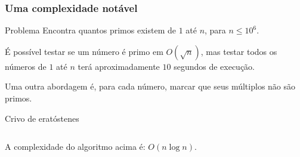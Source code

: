 \begin{frame}[fragile]
    \frametitle{Uma complexidade notável}

    \begin{block}{Problema}
        Encontra quantos primos existem de $1$ até $n$, para $n \leq 10^6$.
    \end{block} \pause

    É possível testar se um número é primo em $O(\sqrt{n})$, mas testar todos os números de $1$ até $n$ terá aproximadamente $10$ segundos de execução. \pause

    Uma outra abordagem é, para cada número, marcar que seus múltiplos não são primos. \pause

    \begin{block}{Crivo de eratóstenes}
        \footnotesize
        \inputminted{cpp}{codigos/crivo.cpp}    
    \end{block}

    A complexidade do algoritmo acima é: \pause $O(n \log n)$.

\end{frame}
